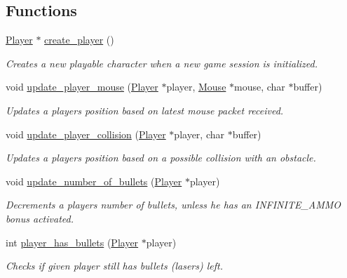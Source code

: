 \subsection*{Functions}
\begin{DoxyCompactItemize}
\item 
\hyperlink{struct_player}{Player} $\ast$ \hyperlink{group__player_ga37a8bafa3bd82b382ed0dc10b6a47bc6}{create\+\_\+player} ()
\begin{DoxyCompactList}\small\item\em Creates a new playable character when a new game session is initialized. \end{DoxyCompactList}\item 
void \hyperlink{group__player_ga4adc2e0586099acc41fc2a01f5fbd17b}{update\+\_\+player\+\_\+mouse} (\hyperlink{struct_player}{Player} $\ast$player, \hyperlink{struct_mouse}{Mouse} $\ast$mouse, char $\ast$buffer)
\begin{DoxyCompactList}\small\item\em Updates a player\textquotesingle{}s position based on latest mouse packet received. \end{DoxyCompactList}\item 
void \hyperlink{group__player_ga957878c48a3fb1afc3fcd55edf22c4dc}{update\+\_\+player\+\_\+collision} (\hyperlink{struct_player}{Player} $\ast$player, char $\ast$buffer)
\begin{DoxyCompactList}\small\item\em Updates a player\textquotesingle{}s position based on a possible collision with an obstacle. \end{DoxyCompactList}\item 
void \hyperlink{group__player_ga00245c5a0bd2c616f7bf886861cf0a59}{update\+\_\+number\+\_\+of\+\_\+bullets} (\hyperlink{struct_player}{Player} $\ast$player)
\begin{DoxyCompactList}\small\item\em Decrements a player\textquotesingle{}s number of bullets, unless he has an I\+N\+F\+I\+N\+I\+T\+E\+\_\+\+A\+M\+MO bonus activated. \end{DoxyCompactList}\item 
int \hyperlink{group__player_ga22a8eae795d9bddb858ac84d0e7371ed}{player\+\_\+has\+\_\+bullets} (\hyperlink{struct_player}{Player} $\ast$player)
\begin{DoxyCompactList}\small\item\em Checks if given player still has bullets (lasers) left. \end{DoxyCompactList}\item 

\end{DoxyCompactItemize}
